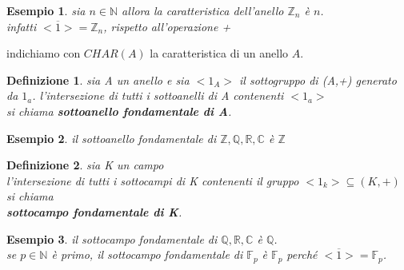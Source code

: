 \documentclass[a4paper,12pt]{article}
\theoremstyle{def}
\newtheorem*{definition}{Definizione}
\theoremstyle{prop}
\theoremstyle{esempio}
\newtheorem*{example}{Esempio}
\theoremstyle{dimostrazione}
\theoremstyle{teo}
\theoremstyle{osservazione}
\begin{document}
\begin{example}
	sia \(n \in \mathbb{N}\) allora la caratteristica dell'anello \(\mathbb{Z}_n\) è \(n\).\\
	infatti \(<\overline{1}> = \mathbb{Z}_n\), rispetto all'operazione +\\
\end{example}

indichiamo con \(CHAR(A)\) la caratteristica di un anello \(A\).\\
\begin{definition}
	sia A un anello e sia \(<1_A>\) il sottogruppo di (A,+) generato da \(1_a\).
	l'intersezione di tutti i sottoanelli di A contenenti \(<1_a>\)\\
	si chiama \textbf{sottoanello fondamentale di A}.\\
\end{definition}

\begin{example}
	il sottoanello fondamentale di \(\mathbb{Z},\mathbb{Q},\mathbb{R},\mathbb{C}\) è \(\mathbb{Z}\)
\end{example}

\begin{definition}
	sia K un campo\\
	l'intersezione di tutti i sottocampi di K contenenti il gruppo \(<1_k> \subseteq (K,+)\) si chiama \\
	\textbf{sottocampo fondamentale di K}.\\
\end{definition}

\begin{example}
	il sottocampo fondamentale di \(\mathbb{Q},\mathbb{R},\mathbb{C}\) è \(\mathbb{Q}\).\\
	se \(p \in \mathbb{N}\) è primo, il sottocampo fondamentale di \(\mathbb{F}_p\) è \(\mathbb{F}_p\) perché \(<\overline{1}> = \mathbb{F}_p\).\\
\end{example}

\newpage
\end{document}
